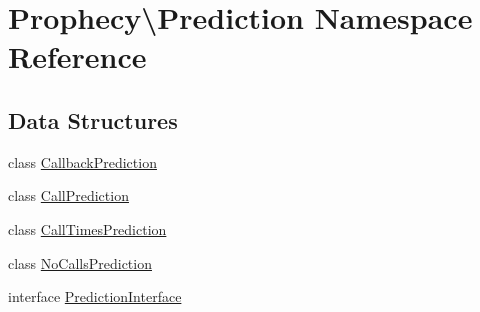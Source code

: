 \hypertarget{namespace_prophecy_1_1_prediction}{}\section{Prophecy\textbackslash{}Prediction Namespace Reference}
\label{namespace_prophecy_1_1_prediction}
\subsection*{Data Structures}
\begin{DoxyCompactItemize}
\item 
class \mbox{\hyperlink{class_prophecy_1_1_prediction_1_1_callback_prediction}{Callback\+Prediction}}
\item 
class \mbox{\hyperlink{class_prophecy_1_1_prediction_1_1_call_prediction}{Call\+Prediction}}
\item 
class \mbox{\hyperlink{class_prophecy_1_1_prediction_1_1_call_times_prediction}{Call\+Times\+Prediction}}
\item 
class \mbox{\hyperlink{class_prophecy_1_1_prediction_1_1_no_calls_prediction}{No\+Calls\+Prediction}}
\item 
interface \mbox{\hyperlink{interface_prophecy_1_1_prediction_1_1_prediction_interface}{Prediction\+Interface}}
\end{DoxyCompactItemize}
